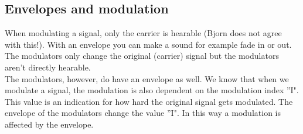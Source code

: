 \subsection{Envelopes and modulation}
When modulating a signal, only the carrier is hearable (Bjorn does not agree with this!). With an envelope you can make a sound for example fade in or out. The modulators only change the original (carrier) signal but the modulators aren't directly hearable.\\  
The modulators, however, do have an envelope as well. We know that when we modulate a signal, the modulation is also dependent on the modulation index ''I". This value is an indication for how hard the original signal gets modulated. The envelope of the modulators change the value ''I". In this way a modulation is affected by the envelope.

